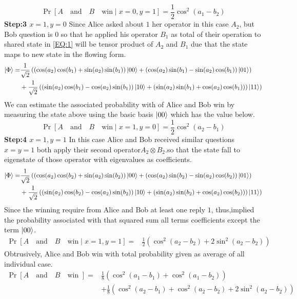 $$\Pr[A\quad \text{and}\quad B \quad \text{win}\mid   x=0 ,y=1]=\frac{1}{2}\cos^2(a_1-b_2)$$
\textbf{Step:3 $x=1 ,y=0$}
Since Alice asked about $1$ her operator in this case $A_2$, but Bob question is $0$ so that he applied his operator $B_1$ as total of their operation to shared state in  \ref{EQ:1} will be tensor product of $A_2$ and $B_1$ due that the state maps to new state in the flowing form.
\begin{align*}
\ket{\Phi}=&\frac{1}{\sqrt{2}}\left( \left(\cos(a_2) \cos(b_1) +\sin(a_2) \sin(b_1)\right)\ket{00}  +\left(\cos(a_2) \sin(b_1) -\sin(a_2) \cos(b_1)\right)\ket{01}\right)\\
&+\frac{1}{\sqrt{2}}\left(\left(\sin(a_2) \cos(b_1)-\cos(a_2) \sin(b_1)\right)\ket{10} +\left(\sin(a_2) \sin(b_1)+\cos(a_2) \cos(b_1) )\right)\ket{11}\right)
\end{align*}
We can estimate the associated probability with of Alice and Bob win by measuring the state above using the basic basis  $\ket{00}$ which has the value below.
$$\Pr[A\quad \text{and}\quad B \quad \text{win}\mid   x=1 ,y=0]=\frac{1}{2}\cos^2(a_2-b_1)$$
\textbf{Step:4 $x=1 ,y=1$}
In this case Alice and Bob received similar questions $ x=y=1$ both apply their second operator$A_2\otimes B_2$.so that the state fall to eigenstate of those operator with eigenvalues as coefficients.
\begin{align*}
\ket{\Phi}=&\frac{1}{\sqrt{2}}\left( \left(\cos(a_2) \cos(b_2) +\sin(a_2) \sin(b_2)\right)\ket{00}  +\left(\cos(a_2) \sin(b_2) -\sin(a_2) \cos(b_2)\right)\ket{01}\right)\\
&+\frac{1}{\sqrt{2}}\left(\left(\sin(a_2) \cos(b_2)-\cos(a_2) \sin(b_2)\right)\ket{10} +\left(\sin(a_2) \sin(b_2)+\cos(a_2) \cos(b_2) )\right)\ket{11}\right)
\end{align*}
Since the winning require from Alice and Bob at least one reply $1$, thus,implied the probability associated with that squared sum all terms  coefficients except  the term $\ket{00}$.
\begin{align*}
\Pr[A\quad \text{and}\quad B \quad \text{win}\mid   x=1 ,y=1]=&\frac{1}{2} \left(\cos^2(a_2-b_2)+2 \sin^2(a_2-b_2)\right)
\end{align*}
Obtrusively, Alice and Bob win with total probability given as average of all individual case.
\begin{align}\label{AND:Pr}
\Pr[A\quad \text{and}\quad B \quad \text{win }  ]=&\frac{1}{8}\left( \cos^2(a_1-b_1)+\cos^2(a_1-b_2)\right)\nonumber\\
&+\frac{1}{8}\left(\cos^2(a_2-b_1)+\cos^2(a_2-b_2)+2\sin^2(a_2-b_2)\right)
\end{align}
